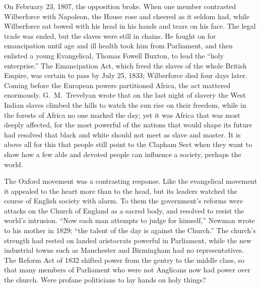 On February 23, 1807, the opposition broke. When one member contrasted Wilberforce with Napoleon,
the House rose and cheered as it seldom had, while Wilberforce sat bowed with his head in his hands
and tears on his face. The legal trade was ended, but the slaves were still in chains. He fought on
for emancipation until age and ill health took him from Parliament, and then enlisted a young
Evangelical, Thomas Fowell Buxton, to lead the ``holy enterprise.'' The Emancipation Act, which freed the slaves of the whole British Empire, was certain to pass by July 25, 1833; Wilberforce died four days later. Coming before the European powers partitioned Africa, the act mattered enormously.
G.~M.~Trevelyan wrote that on the last night of slavery the West Indian slaves climbed the hills to
watch the sun rise on their freedom, while in the forests of Africa no one marked the day; yet it
was Africa that was most deeply affected, for the most powerful of the nations that would shape its future had resolved that black and white should not meet as slave and master. It is above all for this that people still point to the Clapham Sect when they want to show how a few able and devoted people can influence a
society, perhaps the world.

The Oxford movement was a contrasting response. Like the evangelical movement it appealed to the heart more than to the head, but its leaders watched the course of English society with alarm. To them the government's reforms were attacks on the Church of England as a sacred body, and resolved to
resist the world's intrusion. ``Now each man attempts to judge for himself,'' Newman wrote to his
mother in 1829; ``the talent of the day is against the Church.'' The church's strength had rested on
landed aristocrats powerful in Parliament, while the new industrial towns such as Manchester and
Birmingham had no representatives. The Reform Act of 1832 shifted power from the gentry to the middle
class, so that many members of Parliament who were not Anglicans now had power over the church. Were
profane politicians to lay hands on holy things?

